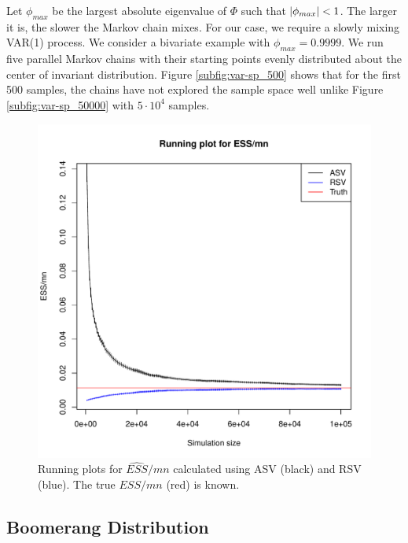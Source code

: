 \documentclass[11pt]{article}
\theoremstyle{remark}
\begin{document}
Let $\phi_{max}$ be the largest absolute eigenvalue of $\Phi$ such that $\abs{\phi_{max}} < 1$. The larger it is, the slower the Markov chain mixes. For our case, we require a slowly mixing VAR(1) process. We consider a bivariate example with $\phi_{max} = 0.9999$. We run five parallel Markov chains with their starting points evenly distributed about the center of invariant distribution. Figure \ref{subfig:var-sp_500} shows that for the first 500 samples, the chains have not explored the sample space well unlike Figure \ref{subfig:var-sp_50000} with $5\cdot 10^4$ samples.  


\begin{figure}[h]
    \centering
    \includegraphics[width = .5\textwidth]{plots/var-ess.pdf}
    \caption{Running plots for $\hat{ESS}/mn$ calculated using ASV (black) and RSV (blue). The true $ESS/mn$ (red) is known.}
    \label{fig:var-ess}
\end{figure}


\subsection{Boomerang Distribution} \label{ex:boomerang}
\end{document}
